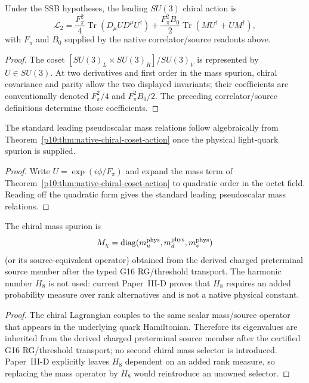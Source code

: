 \documentclass[12pt,a4paper]{article}
\begin{document}
\begin{theorem}
\label{p10:thm:native-chiral-coset-action}
Under the SSB hypotheses, the leading \(SU(3)\) chiral action is
\begin{equation}
\mathcal L_2=\frac{F_\pi^2}{4}\operatorname{Tr}(D_\mu U D^\mu U^\dagger)+\frac{F_\pi^2B_0}{2}\operatorname{Tr}(MU^\dagger+UM^\dagger),
\end{equation}
with \(F_\pi\) and \(B_0\) supplied by the native correlator/source readouts above.
\end{theorem}
\begin{proof}
The coset $[SU(3)_L\times SU(3)_R]/SU(3)_V$ is represented by $U\in SU(3)$.  At two derivatives and first order in the mass spurion, chiral covariance and parity allow the two displayed invariants; their coefficients are conventionally denoted $F_\pi^2/4$ and $F_\pi^2B_0/2$.  The preceding correlator/source definitions determine those coefficients.
\end{proof}

\begin{corollary}
\label{p10:cor:leading-pseudoscalar-mass-pattern}
The standard leading pseudoscalar mass relations follow algebraically from Theorem~\ref{p10:thm:native-chiral-coset-action} once the physical light-quark spurion is supplied.
\end{corollary}
\begin{proof}
Write $U=\exp(i\phi/F_\pi)$ and expand the mass term of Theorem~\ref{p10:thm:native-chiral-coset-action} to quadratic order in the octet field.  Reading off the quadratic form gives the standard leading pseudoscalar mass relations.
\end{proof}



\begin{theorem}
\label{p10:thm:visible-shell-light-chiral-spurion}
The chiral mass spurion is
\begin{equation}
M_\chi=\operatorname{diag}(m_u^{\rm phys},m_d^{\rm phys},m_s^{\rm phys})
\end{equation}
(or its source-equivalent operator) obtained from the derived charged preterminal source member after the typed G16 RG/threshold transport.  The harmonic number \(H_8\) is not used: current Paper~III-D proves that \(H_8\) requires an added probability measure over rank alternatives and is not a native physical constant.
\end{theorem}
\begin{proof}
The chiral Lagrangian couples to the same scalar mass/source operator that appears in the underlying quark Hamiltonian.  Therefore its eigenvalues are inherited from the derived charged preterminal source member after the certified G16 RG/threshold transport; no second chiral mass selector is introduced.  Paper~III-D explicitly leaves $H_8$ dependent on an added rank measure, so replacing the mass operator by $H_8$ would reintroduce an unowned selector.
\end{proof}
\end{document}

